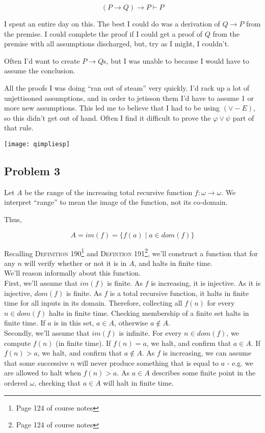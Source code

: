 \documentclass[a4paper]{article}
\newcommand{\SET}[1]{\{ {#1} \}}
\begin{document}
    \[(P \rightarrow Q) \rightarrow P \vdash P\]

    I spent an entire day on this. The best I could do was a derivation of $Q \rightarrow P$ from the premise. I could complete the proof if I could get a proof of $Q$ from the premise with all assumptions discharged, but, try as I might, I couldn't.

    Often I'd want to create $P \rightarrow Q$s, but I was unable to because I would have to assume the conclusion.

    All the proofs I was doing ``ran out of steam'' very quickly. I'd rack up a lot of unjettisoned assumptions, and in order to jetisson them I'd have to assume 1 or more new assumptions. This led me to believe that I had to be using $(\vee-E)$, so this didn't get out of hand. Often I find it difficult to prove the $\varphi \vee \psi$ part of that rule.

    \texttt{[image: qimpliesp]}

\subsection*{Problem 3}

Let $A$ be the range of the increasing total recursive function $f: \omega \rightarrow \omega$. We interpret ``range'' to mean the image of the function, not its co-domain.

Thus,

\[
    A = im(f) = \SET{ f(a) \mid a \in dom(f) }
\]

Recalling \textsc{Definition 190}\footnote{Page 124 of course notes} and \textsc{Defintion 191}\footnote{Page 124 of course notes}, we'll construct a function that for any $n$ will verify whether or not it is in $A$, and halts in finite time. \\

We'll reason informally about this function.\\

First, we'll assume that $im(f)$ is finite. As $f$ is increasing, it is injective. As it is injective, $dom(f)$ is finite. As $f$ is a total recursive function, it halts in finite time for all inputs in its domain. Therefore, collecting all $f(n)$ for every $n \in dom(f)$ halts in finite time. Checking membership of a finite set halts in finite time. If $a$ is in this set, $a \in A$, otherwise $a \not\in A$.\\

Secondly, we'll assume that $im(f)$ is infinite. For every $n \in dom(f)$, we compute $f(n)$ (in finite time). If $f(n) = a$, we halt, and confirm that $a \in A$. If $f(n) > a$, we halt, and confirm that $a \not\in A$. As $f$ is increasing, we can assume that some successive $n$ will never produce something that is equal to $a$ - e.g. we are allowed to halt when $f(n) > a$. As $a \in A$ describes some finite point in the ordered $\omega$, checking that $a \in A$ will halt in finite time.
\end{document}
